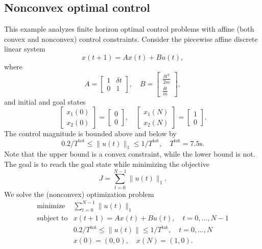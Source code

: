 \subsection{Nonconvex optimal control}
This example analyzes finite horizon optimal control problems with affine (both
convex and nonconvex) control constraints.  Consider the piecewise affine
discrete linear system
\[
	x(t+1) = Ax(t) + Bu(t),
\]
where
\[
	A = 
	\begin{bmatrix} 
			1 & \delta t \\ 
			0 & 1 
	\end{bmatrix},
	\quad
	B = 
	\begin{bmatrix}
		\frac{\delta t^2}{2m} \\
		\frac{\delta t}{m} 
	\end{bmatrix}, 
\]
and initial and goal states
\[
	\begin{bmatrix} 
		x_1(0)\\
		x_2(0)
	\end{bmatrix} = 
	\begin{bmatrix} 
		0\\
		0
	\end{bmatrix},
	\quad
	\begin{bmatrix} 
		x_1(N)\\
		x_2(N)
	\end{bmatrix} = 
	\begin{bmatrix} 
		1\\
		0
	\end{bmatrix}.
\]
The control magnitude is bounded above and below by
\[
	0.2/T^\text{tot} \leq \|u(t)\|_1 \leq 1/T^\text{tot}, \quad 
	T^\text{tot}=7.5\text{s}.
\]
Note that the upper bound is a convex constraint, while the lower bound is not.
The goal is to reach the goal state while minimizing the objective
\[
	J = \sum_{t=0}^{N-1} \|u(t)\|_1.
\]
We solve the (nonconvex) optimization problem
\[
	\begin{array}{ll}
		\mbox{minimize}   & \sum_{t=0}^{N-1} \|u(t)\|_1 \\
		\mbox{subject to} 
			& x(t+1) = A x(t) + Bu(t), \quad t=0,\ldots,N-1\\
			& 0.2/T^\text{tot} \leq \|u(t)\| \leq 1/T^\text{tot}, \quad t=0,\ldots,N\\
			& x(0) = (0, 0), \quad x(N) = (1, 0).
	\end{array}
\]
